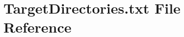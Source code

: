 \hypertarget{TargetDirectories_8txt}{}\section{Target\+Directories.\+txt File Reference}
\label{TargetDirectories_8txt}

